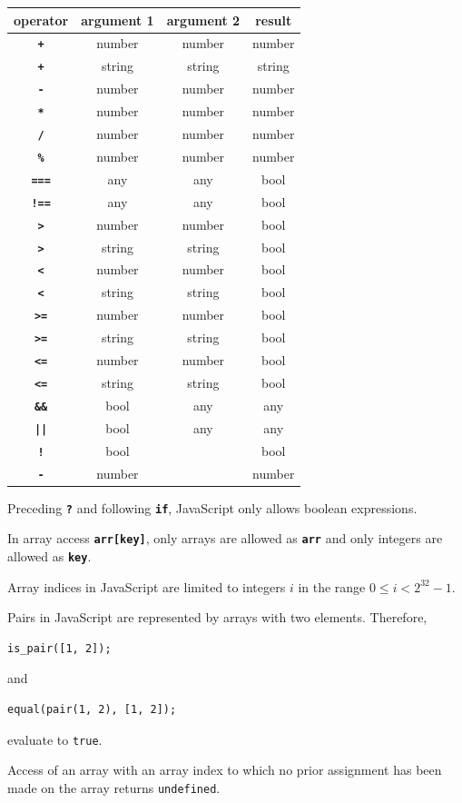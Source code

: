 \begin{center}
\begin{tabular}{c|c|c|c}
operator & argument 1 & argument 2 & result\\ \hline
\texttt{\textbf{+}} & number   & number     & number\\
\texttt{\textbf{+}} & string   & string     & string\\
\texttt{\textbf{-}} & number   & number     & number\\
\texttt{\textbf{*}} & number   & number     & number\\
\texttt{\textbf{/}} & number   & number     & number\\
\texttt{\textbf{\%}} & number   & number     & number\\
\texttt{\textbf{===}} & any  & any     & bool\\
\texttt{\textbf{!==}} & any   & any     & bool\\
\texttt{\textbf{>}} & number   & number     & bool\\
\texttt{\textbf{>}} & string   & string     & bool\\
\texttt{\textbf{<}} & number   & number     & bool\\
\texttt{\textbf{<}} & string   & string     & bool\\
\texttt{\textbf{>=}} & number   & number     & bool\\
\texttt{\textbf{>=}} & string   & string     & bool\\
\texttt{\textbf{<=}}    & number   & number     & bool\\
\texttt{\textbf{<=}} & string   & string     & bool\\
\texttt{\textbf{\&\&}} & bool & any & any\\
\texttt{\textbf{||}}   & bool & any & any\\
\texttt{\textbf{!}}    & bool &      & bool\\
\texttt{\textbf{-}}    & number &    & number
\end{tabular}
\end{center}

Preceding \texttt{\textbf{?}} and following \texttt{\textbf{if}}, JavaScript only allows
boolean expressions.

In array access \texttt{\textbf{arr[key]}},
only arrays are allowed as \texttt{\textbf{arr}} and
only integers are allowed as \texttt{\textbf{key}}.

Array indices in JavaScript are limited to integers $i$ in the range $0 \le i < 2^{32} - 1$.

Pairs in JavaScript are represented by arrays with two elements. Therefore,
\begin{lstlisting}
is_pair([1, 2]);
\end{lstlisting}
and
\begin{lstlisting}
equal(pair(1, 2), [1, 2]);
\end{lstlisting}
evaluate to \texttt{true}.

Access of an array with an array index to which no prior assignment has been
made on the array returns \texttt{undefined}.
